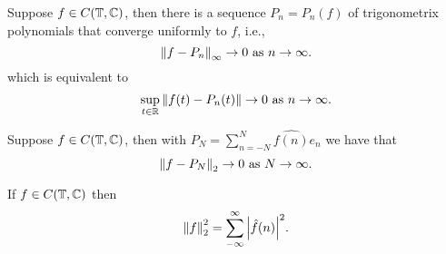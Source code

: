 \documentclass[twoside]{article}
\begin{document}
\begin{theorem}
    Suppose $f \in C(\mathbb{T}, \mathbb{C})$, then there is a sequence 
    $P_{n} = P_{n}(f)$ of trigonometrix polynomials that converge 
    uniformly to $f$, i.e., 
    \begin{equation*}
        \norm{f - P_{n}}_{\infty} \to 0 \text{ as } n \to \infty.
    \end{equation*}
    which is equivalent to 
    \begin{equation*}
        \sup_{t \in \mathbb{R}} \norm{f(t) - P_{n}(t)} \to 0 \text{ as } n \to \infty.
    \end{equation*}
\end{theorem}

\begin{theorem}
    Suppose $f \in C(\mathbb{T}, \mathbb{C})$, then with 
    $P_{N} = \sum_{n = -N}^{N} \hat{f(n)}e_{n}$ we have that 
    \begin{equation*}
        \norm{f - P_{N}}_{2} \to 0 \text{ as } N \to \infty.
    \end{equation*}
\end{theorem}

\begin{theorem}
    If $f \in C(\mathbb{T}, \mathbb{C})$ then 
    \begin{equation*}
        \norm{f}_{2}^{2} = \sum_{-\infty}^{\infty}\abs{\hat{f}(n)}^{2}.
    \end{equation*}
\end{theorem}
\end{document}
